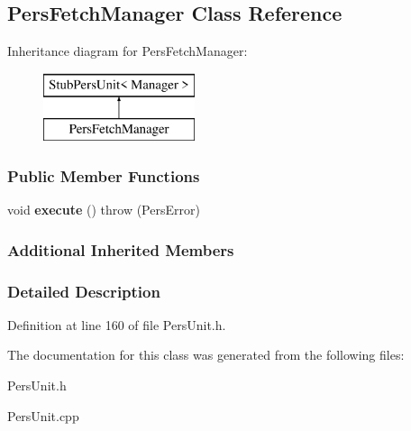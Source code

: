 \hypertarget{classPersFetchManager}{\subsection{Pers\-Fetch\-Manager Class Reference}
\label{d7/de3/classPersFetchManager}
}
Inheritance diagram for Pers\-Fetch\-Manager\-:\begin{figure}[H]
\begin{center}
\leavevmode
\includegraphics[height=2.000000cm]{d7/de3/classPersFetchManager}
\end{center}
\end{figure}
\subsubsection*{Public Member Functions}
\begin{DoxyCompactItemize}
\item 
\hypertarget{classPersFetchManager_aca78de204167406eb461f932e05d6920}{void {\bfseries execute} ()  throw (\-Pers\-Error)}\label{d7/de3/classPersFetchManager_aca78de204167406eb461f932e05d6920}

\end{DoxyCompactItemize}
\subsubsection*{Additional Inherited Members}


\subsubsection{Detailed Description}


Definition at line 160 of file Pers\-Unit.\-h.



The documentation for this class was generated from the following files\-:\begin{DoxyCompactItemize}
\item 
Pers\-Unit.\-h\item 
Pers\-Unit.\-cpp\end{DoxyCompactItemize}
